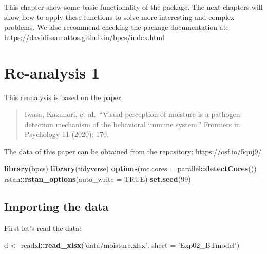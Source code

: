 \documentclass[
]{book}
\newenvironment{Shaded}{\begin{snugshade}}{\end{snugshade}}
\newcommand{\DataTypeTok}[1]{\textcolor[rgb]{0.13,0.29,0.53}{#1}}
\newcommand{\DecValTok}[1]{\textcolor[rgb]{0.00,0.00,0.81}{#1}}
\newcommand{\KeywordTok}[1]{\textcolor[rgb]{0.13,0.29,0.53}{\textbf{#1}}}
\newcommand{\NormalTok}[1]{#1}
\newcommand{\OperatorTok}[1]{\textcolor[rgb]{0.81,0.36,0.00}{\textbf{#1}}}
\newcommand{\OtherTok}[1]{\textcolor[rgb]{0.56,0.35,0.01}{#1}}
\newcommand{\StringTok}[1]{\textcolor[rgb]{0.31,0.60,0.02}{#1}}
\begin{document}
This chapter show some basic functionality of the package. The next chapters will show how to apply these functions to solve more interesting and complex problems. We also recommend checking the package documentation at: \url{https://davidissamattos.github.io/bpcs/index.html}

\hypertarget{studyI}{%
\chapter{Re-analysis 1}\label{studyI}}

This reanalysis is based on the paper:

\begin{quote}
Iwasa, Kazunori, et al.~``Visual perception of moisture is a pathogen detection mechanism of the behavioral immune system.'' Frontiers in Psychology 11 (2020): 170.
\end{quote}

The data of this paper can be obtained from the repository: \url{https://osf.io/5quj9/}

\begin{Shaded}
\begin{Highlighting}[]
\KeywordTok{library}\NormalTok{(bpcs)}
\KeywordTok{library}\NormalTok{(tidyverse)}
\KeywordTok{options}\NormalTok{(}\DataTypeTok{mc.cores =}\NormalTok{ parallel}\OperatorTok{::}\KeywordTok{detectCores}\NormalTok{())}
\NormalTok{rstan}\OperatorTok{::}\KeywordTok{rstan_options}\NormalTok{(}\DataTypeTok{auto_write =} \OtherTok{TRUE}\NormalTok{)}
\KeywordTok{set.seed}\NormalTok{(}\DecValTok{99}\NormalTok{)}
\end{Highlighting}
\end{Shaded}

\hypertarget{importing-the-data}{%
\section{Importing the data}\label{importing-the-data}}

First let's read the data:

\begin{Shaded}
\begin{Highlighting}[]
\NormalTok{d <-}\StringTok{ }\NormalTok{readxl}\OperatorTok{::}\KeywordTok{read_xlsx}\NormalTok{(}\StringTok{'data/moisture.xlsx'}\NormalTok{, }\DataTypeTok{sheet =} \StringTok{'Exp02_BTmodel'}\NormalTok{)}
\end{Highlighting}
\end{Shaded}
\end{document}
